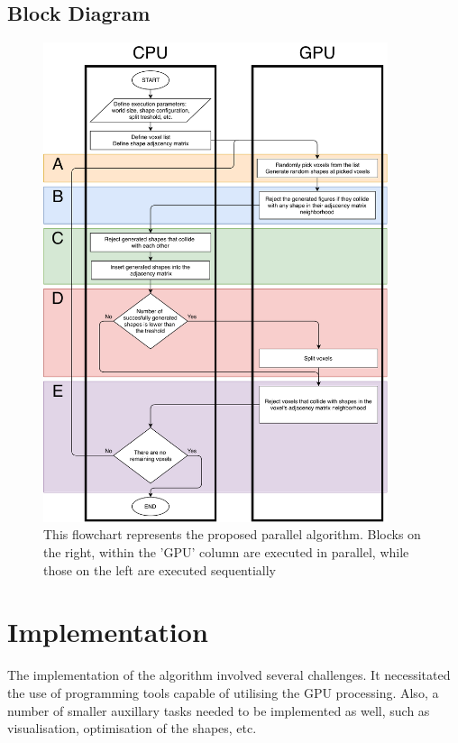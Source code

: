 \documentclass[12pt, oneside]{report}
\begin{document}
\subsection{Block Diagram}

\begin{figure}[H]
  \centering
	\label{GPURSABlockDiagramPdf}
	\includegraphics[width=0.9\textwidth,height=0.9\textheight,keepaspectratio]{Images/GPURSA/GPUDiagram1.pdf}
	\caption{This flowchart represents the proposed parallel algorithm. \newline
		Blocks on the right, within the 'GPU' column are executed in parallel, while those on the left are executed sequentially}
\end{figure}

\section {Implementation}

The implementation of the algorithm involved several challenges. It necessitated the use of programming tools capable of utilising the GPU processing. Also, a number of smaller auxillary tasks needed to be implemented as well, such as visualisation, optimisation of the shapes, etc.
\end{document}
